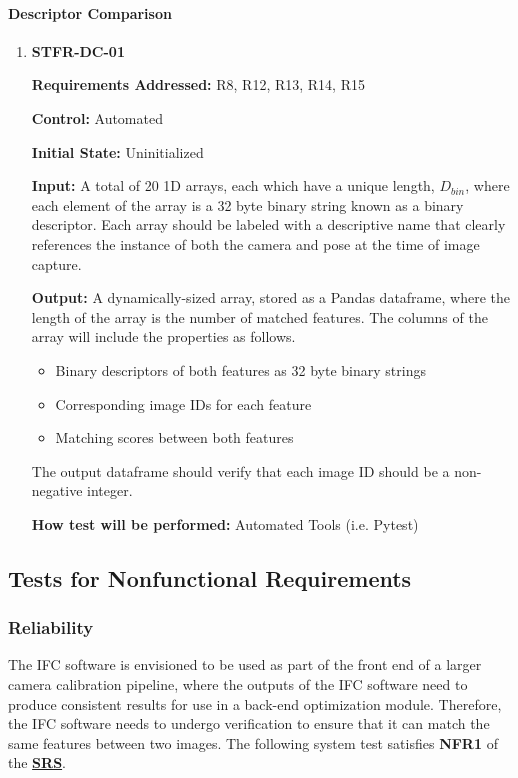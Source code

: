 \documentclass[12pt, titlepage]{article}
\begin{document}
\paragraph{Descriptor Comparison}
\begin{enumerate}
\item \hypertarget{STFR-DC-01}{\textbf{STFR-DC-01}\\}
\textbf{Requirements Addressed:} R8, R12, R13, R14, R15

\textbf{Control:} Automated		

\textbf{Initial State:} Uninitialized

\textbf{Input:} A total of 20 1D arrays, each which have a unique length, $D_{bin}$, where each element of the 
array is a 32 byte binary string known as a binary descriptor. Each array should be labeled with a 
descriptive name that clearly references the instance of both the camera and pose at the time of image 
capture.

\textbf{Output:} A dynamically-sized array, stored as a Pandas dataframe, where the length of the array is the 
number of matched features. The columns of the array will include the properties as follows.
\begin{itemize}
\item Binary descriptors of both features as 32 byte binary strings
\item Corresponding image IDs for each feature
\item Matching scores between both features
\end{itemize}

The output dataframe should verify that each image ID should be a non-negative integer.

\textbf{How test will be performed:} Automated Tools (i.e. Pytest)
\end{enumerate}

\subsection{Tests for Nonfunctional Requirements}\label{NFR_Tests}
\subsubsection{Reliability}
The IFC software is envisioned to be used as part of the front end of a larger camera calibration pipeline, 
where the outputs of the IFC software need to produce consistent results for use in a back-end optimization 
module. Therefore, the IFC software needs to undergo verification to ensure that it can match the same 
features between two images. The following system test satisfies \textbf{NFR1} of the 
\textbf{\href{https://github.com/KiranSingh15/CAS-741-Image-Correspondences/blob/main/docs/SRS/SRS.pdf}
{SRS}}.
\end{document}
